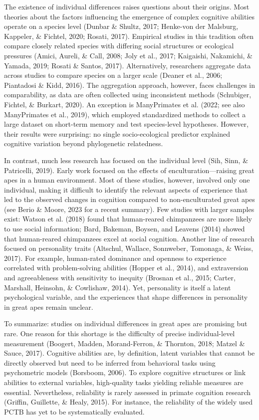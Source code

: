 \documentclass[
  man,floatsintext]{apa6}
\begin{document}
The existence of individual differences raises questions about their origins. Most theories about the factors influencing the emergence of complex cognitive abilities operate on a species level (Dunbar \& Shultz, 2017; Henke-von der Malsburg, Kappeler, \& Fichtel, 2020; Rosati, 2017). Empirical studies in this tradition often compare closely related species with differing social structures or ecological pressures (Amici, Aureli, \& Call, 2008; Joly et al., 2017; Kaigaishi, Nakamichi, \& Yamada, 2019; Rosati \& Santos, 2017). Alternatively, researchers aggregate data across studies to compare species on a larger scale (Deaner et al., 2006; Piantadosi \& Kidd, 2016). The aggregation approach, however, faces challenges in comparability, as data are often collected using inconsistent methods (Schubiger, Fichtel, \& Burkart, 2020). An exception is ManyPrimates et al. (2022; see also ManyPrimates et al., 2019), which employed standardized methods to collect a large dataset on short-term memory and test species-level hypotheses. However, their results were surprising: no single socio-ecological predictor explained cognitive variation beyond phylogenetic relatedness.

In contrast, much less research has focused on the individual level (Sih, Sinn, \& Patricelli, 2019). Early work focused on the effects of enculturation---raising great apes in a human environment. Most of these studies, however, involved only one individual, making it difficult to identify the relevant aspects of experience that led to the observed changes in cognition compared to non-enculturated great apes (see Berio \& Moore, 2023 for a recent summary). Few studies with larger samples exist: Watson et al. (2018) found that human-reared chimpanzees are more likely to use social information; Bard, Bakeman, Boysen, and Leavens (2014) showed that human-reared chimpanzees excel at social cognition. Another line of research focused on personality traits (Altschul, Wallace, Sonnweber, Tomonaga, \& Weiss, 2017). For example, human-rated dominance and openness to experience correlated with problem-solving abilities (Hopper et al., 2014), and extraversion and agreeableness with sensitivity to inequity (Brosnan et al., 2015; Carter, Marshall, Heinsohn, \& Cowlishaw, 2014). Yet, personality is itself a latent psychological variable, and the experiences that shape differences in personality in great apes remain unclear.

To summarize: studies on individual differences in great apes are promising but rare. One reason for this shortage is the difficulty of precise individual-level measurement (Boogert, Madden, Morand-Ferron, \& Thornton, 2018; Matzel \& Sauce, 2017). Cognitive abilities are, by definition, latent variables that cannot be directly observed but need to be inferred from behavioral tasks using psychometric models (Borsboom, 2006). To explore cognitive structures or link abilities to external variables, high-quality tasks yielding reliable measures are essential. Nevertheless, reliability is rarely assessed in primate cognition research (Griffin, Guillette, \& Healy, 2015). For instance, the reliability of the widely used PCTB has yet to be systematically evaluated.
\end{document}
